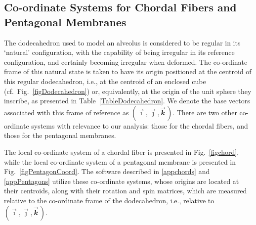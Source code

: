 \subsection{Co-ordinate Systems for Chordal Fibers and Pentagonal Membranes}

The dodecahedron used to model an alveolus is considered to be regular in its `natural' configuration, with the capability of being irregular in its reference configuration, and certainly becoming irregular when deformed.  The co-ordinate frame of this natural state is taken to have its origin positioned at the centroid of this regular dodecahedron, i.e., at the centroid of an enclosed cube (cf.\ Fig.~\ref{figDodecahedron}) or, equivalently, at the origin of the unit sphere they inscribe, as presented in Table~\ref{TableDodecahedron}.  We denote the base vectors associated with this frame of reference as $( \vec{\boldsymbol{\imath}} , \vec{\boldsymbol{\jmath}} , \vec{\mathbfit{k}} \, )$.  There are two other co-ordinate systems with relevance to our analysis: those for the chordal fibers, and those for the pentagonal membranes.

The local co-ordinate system of a chordal fiber is presented in Fig.~\ref{figchord}, while the local co-ordinate system of a pentagonal membrane is presented in Fig.~\ref{figPentagonCoord}.  The software described in \ref{appchords} and \ref{appPentagons} utilize these co-ordinate systems, whose origins are located at their centroids, along with their rotation and spin matrices, which are measured relative to the co-ordinate frame of the dodecahedron, i.e., relative to $( \vec{\boldsymbol{\imath}} , \vec{\boldsymbol{\jmath}} , \vec{\mathbfit{k}} \, )$.

